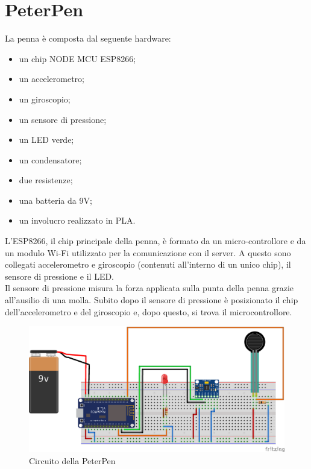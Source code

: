 \documentclass[8pt,notitlepage]{report}
\begin{document}
	\section{PeterPen}
		La penna è composta dal seguente hardware:
		\begin{itemize}
			\setlength\itemsep{.1em}
			\item un chip NODE MCU ESP8266;
			\item un accelerometro;
			\item un giroscopio;
			\item un sensore di pressione;
			\item un LED verde;
			\item un condensatore;
			\item due resistenze;
			\item una batteria da 9V;
			\item un involucro realizzato in PLA.
		\end{itemize}
		L'ESP8266, il chip principale della penna, è formato da un micro-controllore e da un modulo Wi-Fi utilizzato per la comunicazione con il server. A questo sono collegati accelerometro e giroscopio (contenuti all'interno di un unico chip), il sensore di pressione e il LED. \\
		Il sensore di pressione misura la forza applicata sulla punta della penna grazie all'ausilio di una molla. Subito dopo il sensore di pressione è posizionato il chip dell'accelerometro e del giroscopio e, dopo questo, si trova il microcontrollore. \\
		
		\begin{figure}[H]
			\begin{center}
				\includegraphics[scale=.35]{circuito}
				\caption{Circuito della PeterPen}
				\label{fig:circuito}
			\end{center}
		\end{figure}
\end{document}
